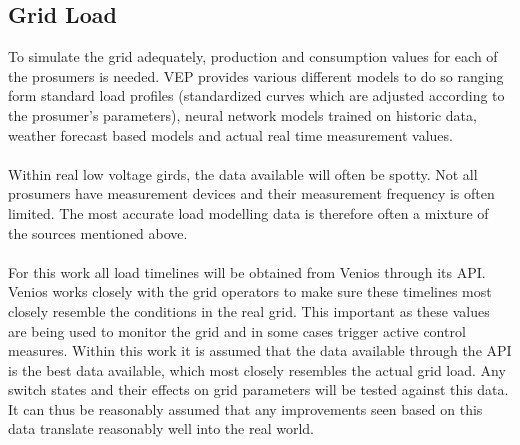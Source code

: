 
\subsection{Grid Load}

To simulate the grid adequately, production and consumption values for
each of the prosumers is needed. VEP provides various different models
to do so ranging form standard load profiles (standardized curves which are adjusted
according to the prosumer's parameters), neural network models trained on historic data,
weather forecast based models and actual real time measurement values\autocite{venios}.\\
\\
Within real low voltage girds, the data available will often be spotty. Not all prosumers
have measurement devices and their measurement frequency is often limited. The most accurate
load modelling data is therefore often a mixture of the sources mentioned above.\\
\\ 
For this work all load timelines will be obtained from Venios through its API. Venios works
closely with the grid operators to make sure these timelines most closely resemble the conditions
in the real grid. This important as these values are being used to monitor the grid and in some
cases trigger active control measures\autocite{venios}. Within this work it is assumed that the data
available through the API is the best data available, which most closely resembles the actual grid load.
Any switch states and their effects on grid parameters will be tested against this data. It can
thus be reasonably assumed that any improvements seen based on this data translate reasonably well
into the real world. 

